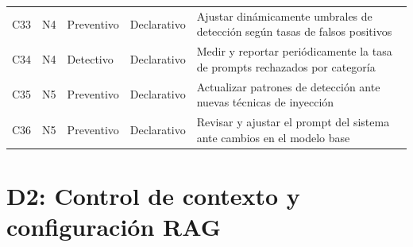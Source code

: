\begin{longtable}{@{}l c l l L{6.5cm}@{}}
  C33 & N4 & Preventivo    & Declarativo   & Ajustar dinámicamente umbrales de detección según tasas de falsos positivos \\
  C34 & N4 & Detectivo     & Declarativo   & Medir y reportar periódicamente la tasa de prompts rechazados por categoría \\
  C35 & N5 & Preventivo    & Declarativo   & Actualizar patrones de detección ante nuevas técnicas de inyección \\
  C36 & N5 & Preventivo    & Declarativo   & Revisar y ajustar el prompt del sistema ante cambios en el modelo base \\
\end{longtable}

\section*{D2: Control de contexto y configuración RAG}

